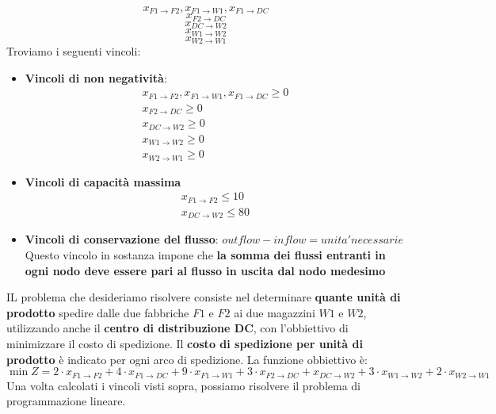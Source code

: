 \documentclass[12pt]{article}
\begin{document}
$$x_{F1 \rightarrow F2}, x_{F1 \rightarrow W1}, x_{F1 \rightarrow DC}$$
$$x_{F2  \rightarrow DC}$$
$$x_{DC \rightarrow W2}$$
$$x_{W1 \rightarrow W2}$$
$$x_{W2 \rightarrow W1}$$
Troviamo i seguenti vincoli:
\begin{itemize}
    \item \textbf{Vincoli di non negatività}:
    \begin{equation*}
        \begin{array}{ll}
            x_{F1 \rightarrow F2}, x_{F1 \rightarrow W1}, x_{F1 \rightarrow DC} \geq 0 \\
            x_{F2  \rightarrow DC} \geq 0 \\
            x_{DC \rightarrow W2} \geq 0 \\
            x_{W1 \rightarrow W2} \geq 0  \\
            x_{W2 \rightarrow W1} \geq 0
        \end{array}
    \end{equation*}
    \item \textbf{Vincoli di capacità massima}
    \begin{equation*}
        \begin{array}{ll}
            x_{F1 \rightarrow F2} \leq 10 \\
            x_{DC \rightarrow W2} \leq 80
        \end{array}
    \end{equation*}
    \item \textbf{Vincoli di conservazione del flusso}: $outflow - inflow = unita' necessarie$ \newline
    Questo vincolo in sostanza impone che \textbf{la somma dei flussi entranti in ogni nodo deve essere pari al flusso in uscita dal nodo medesimo}
\end{itemize}
IL problema che desideriamo risolvere consiste nel determinare \textbf{quante unità di prodotto} spedire dalle due fabbriche $F1$ e $F2$ ai due magazzini
$W1$ e $W2$, utilizzando anche il \textbf{centro di distribuzione DC}, con l'obbiettivo di minimizzare il costo di spedizione. Il \textbf{costo di spedizione per unità di prodotto}
è indicato per ogni arco di spedizione.
La funzione obbiettivo è:
$$\min Z = 2 \cdot x_{F1 \rightarrow F2} + 4 \cdot x_{F1 \rightarrow DC} + 9 \cdot x_{F1 \rightarrow W1} + 3 \cdot x_{F2 \rightarrow DC} + x_{DC \rightarrow W2} + 3 \cdot x_{W1 \rightarrow W2} + 2 \cdot x_{W2 \rightarrow W1}$$
Una volta calcolati i vincoli visti sopra, possiamo risolvere il problema di programmazione lineare.
\end{document}
